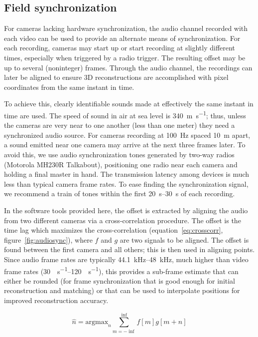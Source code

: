 \documentclass[fleqn,10pt]{wlpeerj}
\begin{document}
\subsection*{Field synchronization}
For cameras lacking hardware synchronization, the audio channel recorded with each video can be used to provide an alternate means of synchronization. For each recording, cameras may start up or start recording at slightly different times, especially when triggered by a radio trigger.  The resulting offset may be up to several (noninteger) frames.  Through the audio channel, the recordings can later be aligned to ensure 3D reconstructions are accomplished with pixel coordinates from the same instant in time. 

To achieve this, clearly identifiable sounds made at effectively the same instant in time are used.  The speed of sound in air at sea level is \SI{340}{\meter\per\second}; thus, unless the cameras are very near to one another (less than one meter) they need a synchronized audio source.  For cameras recording at \SI{100}{\hertz} spaced \SI{10}{\meter} apart, a sound emitted near one camera may arrive at the next three frames later. To avoid this, we use audio synchronization tones generated by two-way radios (Motorola MH230R Talkabout), positioning one radio near each camera and holding a final master in hand. The transmission latency among devices is much less than typical camera frame rates. To ease finding the synchronization signal, we recommend a train of tones within the first \SIrange{20}{30}{\second} of each recording.

In the software tools provided here, the offset is extracted by aligning the audio from two different cameras via a cross-correlation procedure.  The offset is the time lag which maximizes the cross-correlation (equation~\ref{eq:crosscorr}, figure~\ref{fig:audiosync}), where $f$ and $g$ are two signals to be aligned.  The offset is found between the first camera and all others; this is then used in aligning points. Since audio frame rates are typically \SIrange{44.1}{48}{\kilo\hertz}, much higher than video frame rates (\SIrange{30}{120}{\frame\per\second}), this provides a sub-frame estimate that can either be rounded (for frame synchronization that is good enough for initial reconstruction and matching) or that can be used to interpolate positions for improved reconstruction accuracy. 

\begin{equation}
\label{eq:crosscorr}
\hat{n} = \mbox{argmax}_n \sum_{m=-\inf}^{\inf} f[m] g[m+n]
\end{equation}
\end{document}

